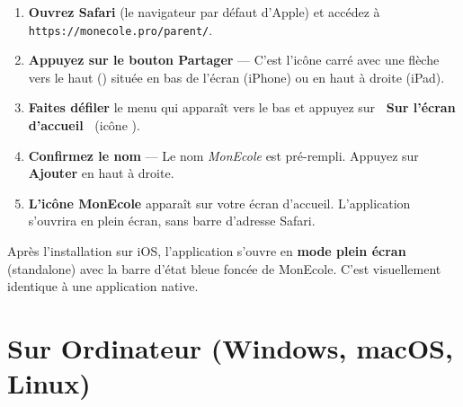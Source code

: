 \documentclass[12pt,a4paper]{report}
\begin{document}
\begin{etape}[title=Proc\'edure : Installation sur iOS]
\begin{enumerate}[leftmargin=1.5cm,label=\textbf{\arabic*.},itemsep=12pt]
  \item \textbf{Ouvrez Safari} (le navigateur par d\'efaut d'Apple) et acc\'edez \`a \texttt{https://monecole.pro/parent/}.

  \item \textbf{Appuyez sur le bouton Partager} --- C'est l'ic\^one carr\'e avec une fl\`eche vers le haut (\faShareSquare) situ\'ee en bas de l'\'ecran (iPhone) ou en haut \`a droite (iPad).

  \item \textbf{Faites d\'efiler} le menu qui appara\^it vers le bas et appuyez sur \textbf{\guillemotleft~Sur l'\'ecran d'accueil~\guillemotright} (ic\^one \faPlusSquare).

  \item \textbf{Confirmez le nom} --- Le nom \textit{MonEcole} est pr\'e-rempli. Appuyez sur \textbf{Ajouter} en haut \`a droite.

  \item \textbf{L'ic\^one MonEcole} appara\^it sur votre \'ecran d'accueil. L'application s'ouvrira en plein \'ecran, sans barre d'adresse Safari.
\end{enumerate}
\end{etape}

\begin{astuce}
Apr\`es l'installation sur iOS, l'application s'ouvre en \textbf{mode plein \'ecran} (standalone) avec la barre d'\'etat bleue fonc\'ee de MonEcole. C'est visuellement identique \`a une application native.
\end{astuce}

\section{Sur Ordinateur (Windows, macOS, Linux)}
\end{document}
